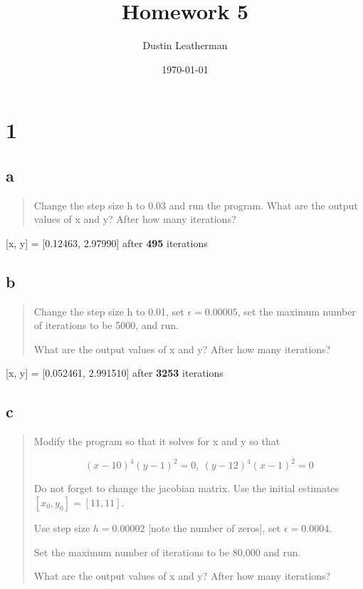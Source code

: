 \documentclass[11pt]{article}
\author{Dustin Leatherman}
\date{\today}
\title{Homework 5}
\begin{document}
\maketitle
\tableofcontents


\section{1}
\label{sec:orgf51d399}

\subsection{a}
\label{sec:org1afe779}

\begin{quote}
Change the step size h to 0.03 and run the program. What are the output values
of x and y? After how many iterations?
\end{quote}

[x, y] = [0.12463, 2.97990] after \textbf{495} iterations

\subsection{b}
\label{sec:org48d0443}

\begin{quote}
Change the step size h to 0.01, set \(\epsilon = 0.00005\), set the maximum number
of iterations to be 5000, and run.

What are the output values of x and y? After how many iterations?
\end{quote}


[x, y] = [0.052461, 2.991510] after \textbf{3253} iterations

\subsection{c}
\label{sec:orgd678d79}

\begin{quote}
Modify the program so that it solves for x and y so that

$$
(x - 10)^4 (y - 1)^2 = 0, \ (y - 12)^4 (x - 1)^2 = 0
$$

Do not forget to change the jacobian matrix. Use the initial estimates \([x_0,
y_0] = [11, 11]\).

Use step size \(h = 0.00002\) [note the number of zeros], set \(\epsilon = 0.0004\).

Set the maximum number of iterations to be 80,000 and run.

What are the output values of x and y? After how many iterations?
\end{quote}
\end{document}
